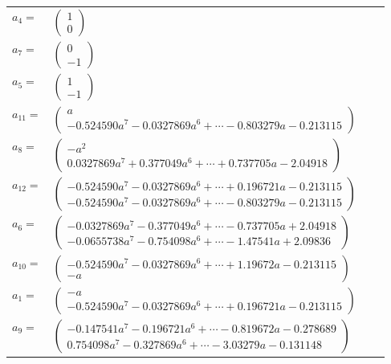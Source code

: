 \documentclass[1p]{elsarticle_modified}
\theoremstyle{definition}
\begin{document}
\begin{tabular}{m{7pt} m{180pt} m{7pt} m{180pt} }
\flushright $a_{4}=$&$\begin{pmatrix}1\\0\end{pmatrix}$ \\
\flushright $a_{7}=$&$\begin{pmatrix}0\\-1\end{pmatrix}$ \\
\flushright $a_{5}=$&$\begin{pmatrix}1\\-1\end{pmatrix}$ \\
\flushright $a_{11}=$&$\begin{pmatrix}a\\-0.524590 a^{7}-0.0327869 a^{6}+\cdots-0.803279 a-0.213115\end{pmatrix}$ \\
\flushright $a_{8}=$&$\begin{pmatrix}- a^2\\0.0327869 a^{7}+0.377049 a^{6}+\cdots+0.737705 a-2.04918\end{pmatrix}$ \\
\flushright $a_{12}=$&$\begin{pmatrix}-0.524590 a^{7}-0.0327869 a^{6}+\cdots+0.196721 a-0.213115\\-0.524590 a^{7}-0.0327869 a^{6}+\cdots-0.803279 a-0.213115\end{pmatrix}$ \\
\flushright $a_{6}=$&$\begin{pmatrix}-0.0327869 a^{7}-0.377049 a^{6}+\cdots-0.737705 a+2.04918\\-0.0655738 a^{7}-0.754098 a^{6}+\cdots-1.47541 a+2.09836\end{pmatrix}$ \\
\flushright $a_{10}=$&$\begin{pmatrix}-0.524590 a^{7}-0.0327869 a^{6}+\cdots+1.19672 a-0.213115\\- a\end{pmatrix}$ \\
\flushright $a_{1}=$&$\begin{pmatrix}- a\\-0.524590 a^{7}-0.0327869 a^{6}+\cdots+0.196721 a-0.213115\end{pmatrix}$ \\
\flushright $a_{9}=$&$\begin{pmatrix}-0.147541 a^{7}-0.196721 a^{6}+\cdots-0.819672 a-0.278689\\0.754098 a^{7}-0.327869 a^{6}+\cdots-3.03279 a-0.131148\end{pmatrix}$ \\

\end{tabular}
\end{document}
